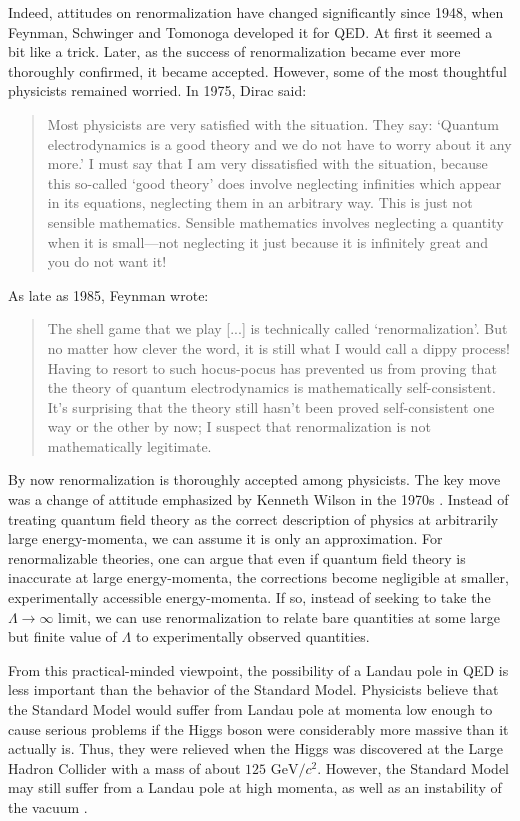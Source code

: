 \documentclass{article}
\begin{document}
Indeed, attitudes on renormalization have changed significantly since 1948, when Feynman, Schwinger and Tomonoga developed it for QED.   At first it seemed a bit like a trick.  Later, as the success of renormalization became ever more thoroughly confirmed, it became accepted.  However, some of the most thoughtful physicists remained worried.   In 1975, Dirac said:
\begin{quote}
Most physicists are very satisfied with the situation. They say: `Quantum electrodynamics is a good theory and we do not have to worry about it any more.' I must say that I am very dissatisfied with the situation, because this so-called `good theory' does involve neglecting infinities which appear in its equations, neglecting them in an arbitrary way. This is just not sensible mathematics. Sensible mathematics involves neglecting a quantity when it is small---not neglecting it just because it is infinitely great and you do not want it!
\end{quote}
As late as 1985, Feynman wrote:
\begin{quote}
The shell game that we play [...] is technically called `renormalization'. But no matter how clever the word, it is still what I would call a dippy process! Having to resort to such hocus-pocus has prevented us from proving that the theory of quantum electrodynamics is mathematically self-consistent. It's surprising that the theory still hasn't been proved self-consistent one way or the other by now; I suspect that renormalization is not mathematically legitimate.
\end{quote}
By now renormalization is thoroughly accepted among physicists.  The key move was a change of attitude emphasized by Kenneth Wilson in the 1970s \cite{WilsonKogut}.  Instead of treating quantum field theory as the correct description of physics at arbitrarily large energy-momenta, we can assume it is only an approximation.  For renormalizable theories, one can argue that even if quantum field theory is inaccurate at large energy-momenta, the corrections become negligible at smaller, experimentally accessible energy-momenta.   If so, instead of seeking to take the $\Lambda \to \infty$ limit, we can use renormalization to relate bare quantities at some large but finite value of $\Lambda$ to experimentally observed quantities.

From this practical-minded viewpoint, the possibility of a Landau pole in QED is less important than the behavior of the Standard Model.  Physicists believe that the Standard Model would suffer from Landau pole at momenta low enough to cause serious problems if the Higgs boson were considerably more massive than it actually is.  Thus, they were relieved when the Higgs was discovered at the Large Hadron Collider with a mass of about $125 \textrm{ GeV}/c^2$.  However, the Standard Model may still suffer from a Landau pole at high momenta, as well as an instability of the vacuum \cite{JKK}.  
\end{document}
